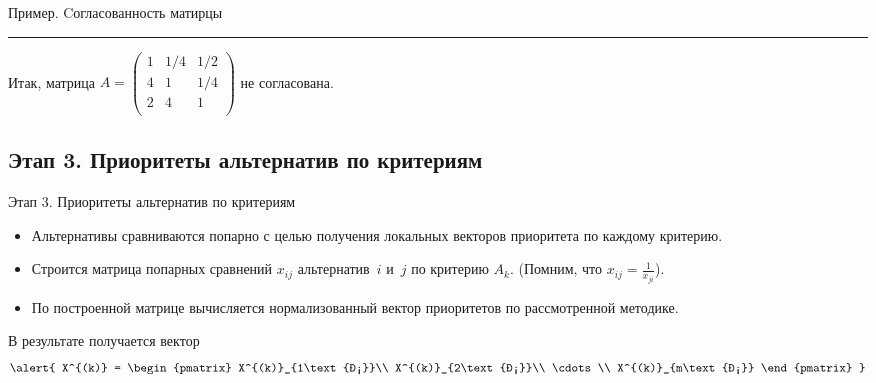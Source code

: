 \documentclass[unicode,11pt,notheorems,xcolor=table]{beamer}
\begin{document}
\begin{frame}[allowframebreaks]{Пример. Cогласованность матирцы}
    \bigskip
    \hrule

    \bigskip
    Итак, матрица  $A=\begin{pmatrix}
        1 & 1/4 & 1/2 \\
        4 & 1 & 1/4 \\
        2 & 4  & 1\\
    \end{pmatrix}$  не согласована.
\end{frame}

\subsection{Этап 3. Приоритеты альтернатив по критериям}
\begin{frame}{Этап 3. Приоритеты альтернатив по критериям}
    \begin{itemize}
        \item Альтернативы сравниваются попарно с целью получения локальных векторов приоритета по каждому критерию.
        \item Строится матрица попарных сравнений $x_{ij}$ альтернатив~$i$ и~$j$ по  критерию $A_k$. (Помним, что $x_{ij}=\frac{1}{x_{ji}}$).
        \item По построенной матрице вычисляется нормализованный вектор приоритетов по рассмотренной методике.
    \end{itemize}
    В результате получается вектор 
    $$
    \alert{
    X^{(k)} = \begin{pmatrix}
        X^{(k)}_{1\text{н}}\\ X^{(k)}_{2\text{н}}\\ \cdots \\ X^{(k)}_{m\text{н}}
    \end{pmatrix}
    }
    $$

\end{frame}
\end{document}
